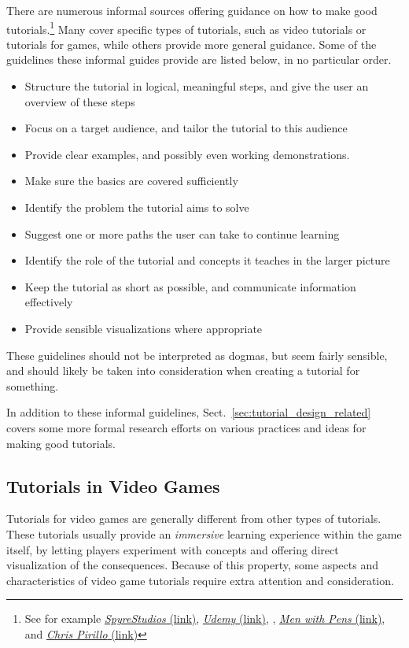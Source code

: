 \noindent
There are numerous informal sources offering guidance on how to make good tutorials.\footnote{See for example \href{http://spyrestudios.com/the-anatomy-of-a-great-tutorial/}{\emph{SpyreStudios} (link)}, \href{https://www.udemy.com/blog/how-to-make-a-great-tutorial-video/}{\emph{Udemy} (link)}, \cite{adams:bad_tutorial}, \href{http://menwithpens.ca/great-tutorial/}{\emph{Men with Pens} (link)}, and \href{http://chris.pirillo.com/how-to-make-a-great-video-tutorial/}{\emph{Chris Pirillo} (link)}} Many cover specific types of tutorials, such as video tutorials or tutorials for games, while others provide more general guidance. Some of the guidelines these informal guides provide are listed below, in no particular order.

\begin{itemize}
	\item Structure the tutorial in logical, meaningful steps, and give the user an overview of these steps
	\item Focus on a target audience, and tailor the tutorial to this audience
	\item Provide clear examples, and possibly even working demonstrations.
	\item Make sure the basics are covered sufficiently
	\item Identify the problem the tutorial aims to solve
	\item Suggest one or more paths the user can take to continue learning
	\item Identify the role of the tutorial and concepts it teaches in the larger picture
	\item Keep the tutorial as short as possible, and communicate information effectively
	\item Provide sensible visualizations where appropriate
\end{itemize}

\noindent
These guidelines should not be interpreted as dogmas, but seem fairly sensible, and should likely be taken into consideration when creating a tutorial for something.

\noindent
In addition to these informal guidelines, Sect.~\ref{sec:tutorial_design_related} covers some more formal research efforts on various practices and ideas for making good tutorials.

\subsection{Tutorials in Video Games}
\label{sec:tutorial_characteristics}
Tutorials for video games are generally different from other types of tutorials. These tutorials usually provide an \emph{immersive} learning experience within the game itself, by letting players experiment with concepts and offering direct visualization of the consequences. Because of this property, some aspects and characteristics of video game tutorials require extra attention and consideration.

